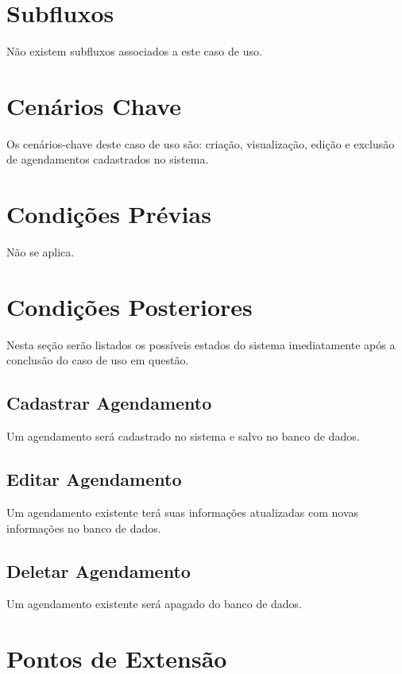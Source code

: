 \documentclass[12pt,a4paper]{article}
\begin{document}
\section{Subfluxos}

Não existem subfluxos associados a este caso de uso.

\section{Cenários Chave}

Os cenários-chave deste caso de uso são: criação, visualização, edição e
exclusão de agendamentos cadastrados no sistema.

\section{Condições Prévias}

Não se aplica.

\section{Condições Posteriores}

Nesta seção serão listados os possíveis estados do sistema imediatamente após
a conclusão do caso de uso em questão.

\subsection{Cadastrar Agendamento}

Um agendamento será cadastrado no sistema e salvo no banco de dados.

\subsection{Editar Agendamento}

Um agendamento existente terá suas informações atualizadas com novas
informações no banco de dados.

\subsection{Deletar Agendamento}

Um agendamento existente será apagado do banco de dados.

\section{Pontos de Extensão}
\end{document}
